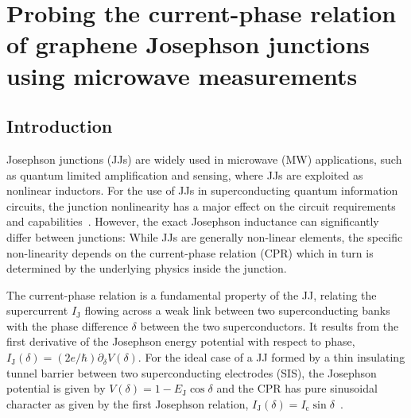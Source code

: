 \newchapstyle
\chapter{Probing the current-phase relation of graphene Josephson junctions using microwave measurements}
\label{chap:gJJ-CPR}


\begin{abstract}
	We perform extensive analysis of graphene Josephson junctions embedded in microwave circuits.
	By comparing a diffusive junction at \SI{15}{\milli\kelvin} with a ballistic one at \SI{15}{\milli\kelvin} and \SI{1}{\kelvin}, we are able to reconstruct the current-phase relation.
\end{abstract}

\afterpage{\pagecolor{none}}\newpage

\section{Introduction}

Josephson junctions (JJs) are widely used in microwave (MW) applications, such as quantum limited amplification and sensing, where JJs are exploited as nonlinear inductors.
%
For the use of JJs in superconducting quantum information circuits, the junction nonlinearity has a major effect on the circuit requirements and capabilities~\cite{kringhojAnharmonicitySuperconductingQubit2018}.
%
However, the exact Josephson inductance can significantly differ between junctions:
%
While JJs are generally non-linear elements, the specific non-linearity depends on the current-phase relation (CPR) which in turn is determined by the underlying physics inside the junction.

The current-phase relation is a fundamental property of the JJ, relating the supercurrent $I_\text{J}$ flowing across a weak link between two superconducting banks with the phase difference $\delta$ between the two superconductors.
%
It results from the first derivative of the Josephson energy potential with respect to phase, $I_\text{J}(\delta) = (2e/\hbar) \partial_\delta V(\delta)$.
%
For the ideal case of a JJ formed by a thin insulating tunnel barrier between two superconducting electrodes (SIS), the Josephson potential is given by $V(\delta)=1-E_\text{J}\cos\delta$ and the CPR has pure sinusoidal character as given by the first Josephson relation, $I_\text{J}(\delta) = I_\text{c}\sin\delta$~\cite{josephsonPossibleNewEffects1962,josephsonSupercurrentsBarriers1965}.

